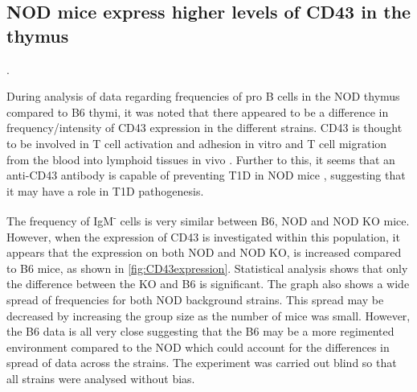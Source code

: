 \subsection{NOD mice express higher levels of CD43 in the thymus}
\label{Results:CD43}

.

During analysis of data regarding frequencies of pro B cells in the NOD thymus compared to B6 thymi, it was noted that there appeared to be a difference in frequency/intensity of CD43 expression in the different strains.
CD43 is thought to be involved in T cell activation and adhesion in vitro \citep{McEvoy1997} and T cell migration from the blood into lymphoid tissues in vivo \citep{Johnson1999}.
Further to this, it seems that an anti-CD43 antibody is capable of preventing T1D in NOD mice \citep{Johnson1999}, suggesting that it may have a role in T1D pathogenesis.

The frequency of IgM\textsuperscript{-} cells is very similar between B6, NOD and NOD KO mice.
However, when the expression of CD43 is investigated within this population, it appears that the expression on both NOD and NOD KO, is increased compared to B6 mice, as shown in \cref{fig:CD43expression}.
Statistical analysis shows that only the difference between the KO and B6 is significant.
The graph also shows a wide spread of frequencies for both NOD background strains.
This spread may be decreased by increasing the group size as the number of mice was small.
However, the B6 data is all very close suggesting that the B6 may be a more regimented environment compared to the NOD which could account for the differences in spread of data across the strains.
The experiment was carried out blind so that all strains were analysed without bias.



